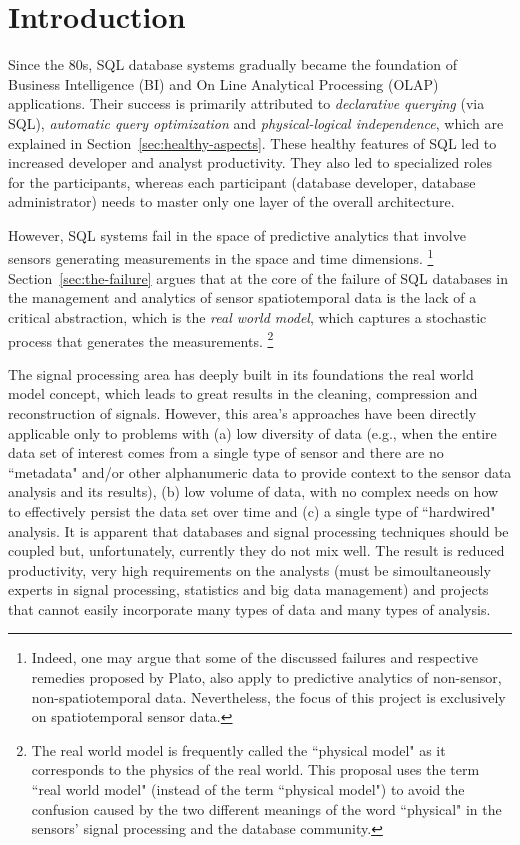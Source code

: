 
\section{Introduction}
\label{sec:introduction}
Since the 80s, SQL database systems gradually became the foundation of Business Intelligence (BI) and On Line Analytical Processing (OLAP) applications. Their success is primarily attributed to {\em declarative querying} (via SQL), {\em automatic query optimization} and {\em physical-logical independence}, which are explained in Section~\ref{sec:healthy-aspects}. These healthy features of SQL led to increased developer and analyst productivity. They also led to specialized roles for the participants, whereas each participant (database developer, database administrator) needs to master only one layer of the overall architecture. 

However, SQL systems fail in the space of predictive analytics that involve sensors generating measurements in the space and time dimensions.%
\footnote{Indeed, one may argue that some of the discussed failures and respective remedies proposed by Plato, also apply to predictive analytics of non-sensor, non-spatiotemporal data. Nevertheless, the focus of this project is exclusively on spatiotemporal sensor data.
}
Section~\ref{sec:the-failure} argues that at the core of the failure of SQL databases in the management and analytics of sensor spatiotemporal data is the lack of a critical abstraction, which is the {\em real world model}, which captures a stochastic process that generates the measurements.%
\footnote{The real world model is frequently called the ``physical model" as it corresponds to the physics of the real world. This proposal uses the term ``real world model" (instead of the term ``physical model") to avoid the confusion caused by the two different meanings of the word ``physical" in the sensors' signal processing and the database community.
}

The signal processing area has deeply built in its foundations the real world model concept, which leads to great results in the cleaning, compression and reconstruction of signals. However, this area's approaches have been directly applicable only to problems with (a) low diversity of data (e.g., when the entire data set of interest comes from a single type of sensor and there are no ``metadata" and/or other alphanumeric data to provide context to the sensor data analysis and its results), (b) low volume of data, with no complex needs on how to effectively persist the data set over time and (c) a single type of ``hardwired" analysis. 
It is apparent that databases and signal processing techniques should be coupled but, unfortunately, currently they do not mix well. The result is reduced productivity, very high requirements on the analysts (must be simoultaneously experts in signal processing, statistics and big data management) and projects that cannot easily incorporate many types of data and many types of analysis.

